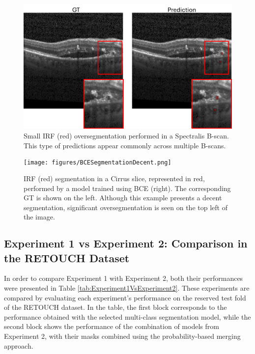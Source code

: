 \begin{figure}[!ht]
	\centering
	\includegraphics[width=0.8\linewidth]{figures/BCESegmentationError.png}
	\caption{Small IRF (red) oversegmentation performed in a Spectralis B-scan. This type of predictions appear commonly across multiple B-scans.}
	\label{fig:BCESegmentationError}
\end{figure}

\begin{figure}[!ht]
	\centering
	\texttt{[image: figures/BCESegmentationDecent.png]}
	\caption{IRF (red) segmentation in a Cirrus slice, represented in red, performed by a model trained using BCE (right). The corresponding GT is shown on the left. Although this example presents a decent segmentation, significant oversegmentation is seen on the top left of the image.}
	\label{fig:BCESegmentationDecent}
\end{figure}

\subsection{Experiment 1 vs Experiment 2: Comparison in the RETOUCH Dataset}

In order to compare Experiment 1 with Experiment 2, both their performances were presented in Table \ref{tab:Experiment1VsExperiment2}. These experiments are compared by evaluating each experiment's performance on the reserved test fold of the RETOUCH dataset. In the table, the first block corresponds to the performance obtained with the selected multi-class segmentation model, while the second block shows the performance of the combination of models from Experiment 2, with their masks combined using the probability-based merging approach.

